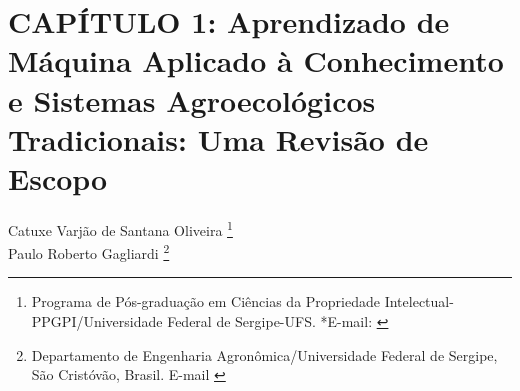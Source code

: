 \pagestyle{plain}

\chapter{CAPÍTULO 1: Aprendizado de Máquina Aplicado à Conhecimento e Sistemas Agroecológicos Tradicionais: Uma Revisão de Escopo}


\begin{flushright}
Catuxe Varjão de Santana Oliveira  \footnote[1]{Programa de Pós-graduação em Ciências da Propriedade Intelectual-PPGPI/Universidade Federal de Sergipe-UFS. *E-mail:  \href{mailto:catuxe@academico.ufs.br}{}}
\\[0.5cm] 
Paulo Roberto Gagliardi \footnote[2]{Departamento de Engenharia Agronômica/Universidade Federal de Sergipe, São Cristóvão, Brasil. E-mail \href{mailto:ppgagri@yahoo.com.br}{}}
\end{flushright}


